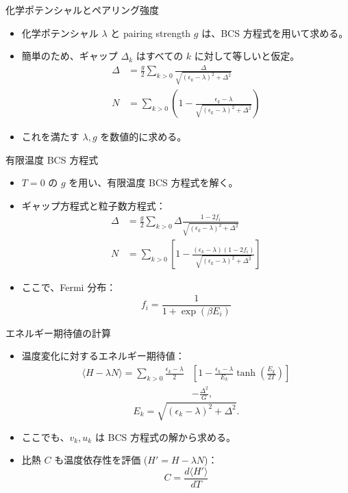 \documentclass[aspectratio=169, 12pt, dvipdfmx]{beamer}
\begin{document}
\begin{frame}{化学ポテンシャルとペアリング強度}
  \begin{itemize}
    \item 化学ポテンシャル \( \lambda \) と pairing strength \( g \) は、BCS 方程式を用いて求める。
    \item 簡単のため、ギャップ \( \Delta_k \) はすべての \( k \) に対して等しいと仮定。
      \begin{align}
        \Delta  &=  \frac{g}{2} \sum_{k>0} \frac{\Delta}{\sqrt{(\epsilon_k - \lambda)^2 + \Delta^2}} \\
        N  &=  \sum_{k>0} \left(1 - \frac{\epsilon_k - \lambda}{\sqrt{(\epsilon_k - \lambda)^2 + \Delta^2}}\right)
      \end{align}
    \item これを満たす \( \lambda, g \) を数値的に求める。
  \end{itemize}
\end{frame}

\begin{frame}{有限温度 BCS 方程式}
  \begin{itemize}
    \item \( T=0 \) の \( g \) を用い、有限温度 BCS 方程式を解く。
    \item ギャップ方程式と粒子数方程式：
      \begin{align}
        \Delta  &=  \frac{g}{2} \sum_{k>0} \Delta\frac{1 - 2 f_i}{\sqrt{(\epsilon_k - \lambda)^2 + \Delta^2}} \\
        N  &=  \sum_{k>0} \left[1 - \frac{(\epsilon_k - \lambda)(1 - 2 f_i)}{\sqrt{(\epsilon_k - \lambda)^2 + \Delta^2}}\right] 
      \end{align}
    \item ここで、Fermi 分布：
      \[
      f_i = \frac{1}{1 + \exp(\beta E_i)}
      \]
  \end{itemize}
\end{frame}

\begin{frame}{エネルギー期待値の計算}
  \begin{itemize}
    \item 温度変化に対するエネルギー期待値：
      \[
      \begin{split}
      \langle H -\lambda N\rangle = \sum_{k>0} \frac{\epsilon_k - \lambda}{2}&\left[
        1 - \frac{\epsilon_k - \lambda}{E_k}\tanh\left(\frac{E_k}{2T}\right)
        \right] \\
        &- \frac{\Delta^2}{G},
      \end{split}
      \]
      \[
        E_k = \sqrt{(\epsilon_k - \lambda)^2 + \Delta^2}.
      \]
    \item ここでも、\( v_k, u_k \) は BCS 方程式の解から求める。
    \item 比熱 \( C \) も温度依存性を評価  (\(H'=H -\lambda N\))：
      \[
      C = \frac{d\langle H' \rangle}{dT}
      \]
  \end{itemize}
\end{frame}
\end{document}
